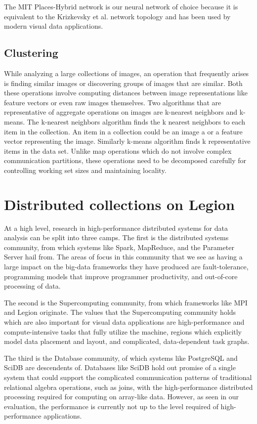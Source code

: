 \documentclass[tog]{acmsiggraph}
\begin{document}
The MIT Places-Hybrid network \cite{zhou2014learning} is our neural network of
choice because it is equivalent to the Krizkevsky et al. network topology
\cite{NIPS2012_4824} and has been used by modern visual data applications.

\subsection{Clustering}

While analyzing a large collections of images, an operation that frequently
arises is finding similar images or discovering groups of images that are
similar. Both these operations involve computing distances between image
representations like feature vectors or even raw images themselves. Two
algorithms that are representative of aggregate operations on images are
k-nearest neighbors and k-means. The k-nearest neighbors algorithm finds the k
nearest neighbors to each item in the collection. An item in a collection could
be an image a or a feature vector representing the image. Similarly k-means
algorithm finds k representative items in the data set. Unlike map operations
which do not involve complex communication partitions, these operations need to
be decomposed carefully for controlling working set sizes and maintaining
locality.

\section{Distributed collections on Legion}

At a high level, research in high-performance distributed systems for data
analysis can be split into three camps. The first is the distributed systems
community, from which systems like Spark, MapReduce, and the Parameter Server
hail from. The areas of focus in this community that we see as having a large
impact on the big-data frameworks they have produced are fault-tolerance,
programming models that improve programmer productivity, and out-of-core
processing of data.

The second is the Supercomputing community, from which frameworks like MPI and
Legion \cite{bauer2012legion} originate. The values that the Supercomputing
community holds which are also important for visual data applications are
high-performance and compute-intensive tasks that fully utilize the machine,
regions which explicitly model data placement and layout, and complicated,
data-dependent task graphs.

The third is the Database community, of which systems like PostgreSQL and SciDB
are descendents of. Databases like SciDB hold out promise of a single system
that could support the complicated communication patterns of traditional
relational algebra operations, such as joins, with the high-performance
distributed processing required for computing on array-like data. However, as
seen in our evaluation, the performance is currently not up to the level
required of high-performance applications.
\end{document}
